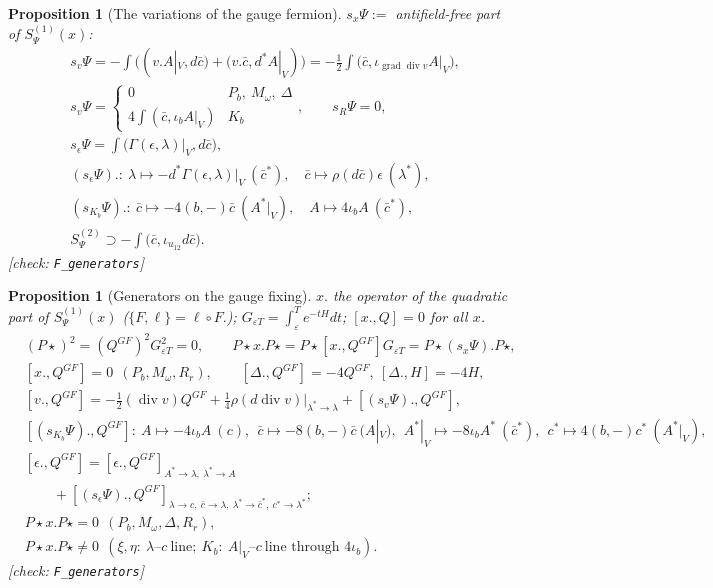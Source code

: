 \documentclass[11pt]{article}
\theoremstyle{plain}
\newtheorem{proposition}[theorem]{Proposition}
\theoremstyle{definition}
\numberwithin{equation}{section}
\begin{document}
\begin{proposition}[The variations of the gauge fermion]
\label{prop:sx}
$s_x\Psi:=$ antifield-free part of $S^{(1)}_\Psi(x)$:
\[
\begin{aligned}
&s_v\Psi=-\int\big((v.A|_V,d\bar c)+(v.\bar c,d^*A|_V)\big)=-\tfrac12\int\big(\bar c,\iota_{\operatorname{grad}\operatorname{div}v}A|_V\big),\\
&s_v\Psi=\begin{cases}0&P_b,\ M_\omega,\ \Delta\\ 4\int(\bar c,\iota_{b}A|_V)&K_b\end{cases},\qquad s_{R}\Psi=0,\\
&s_\epsilon\Psi=\int\big(\Gamma(\epsilon,\lambda)|_V,d\bar c\big),\\
&(s_\epsilon\Psi).:\ \lambda\mapsto-d^*\Gamma(\epsilon,\lambda)|_V\ (\bar c^*),\quad \bar c\mapsto\rho(d\bar c)\epsilon\ (\lambda^*),\\
&(s_{K_b}\Psi).:\ \bar c\mapsto-4(b,-)\bar c\ (A^*|_V),\quad A\mapsto4\iota_bA\ (\bar c^*),\\
&S^{(2)}_\Psi\supset-\int\big(\bar c,\iota_{u_{12}}d\bar c\big).
\end{aligned}
\]
[check: \texttt{F\_generators}]
\end{proposition}

\begin{proposition}[Generators on the gauge fixing]
\label{prop:gen}
$x.$ the operator of the quadratic part of $S^{(1)}_\Psi(x)$ ($\{F,\ell\}=\ell\circ F.$); $G_{\varepsilon T}=\int_\varepsilon^Te^{-tH}dt$; $[x.,Q]=0$ for all $x$.
\[
\begin{aligned}
&(P\star)^2=(Q^{GF})^2G_{\varepsilon T}^2=0,\qquad P\star x.P\star=P\star[x.,Q^{GF}]G_{\varepsilon T}=P\star(s_x\Psi).P\star,\\
&[x.,Q^{GF}]=0\ \ (P_b,M_\omega,R_r),\qquad [\Delta.,Q^{GF}]=-4Q^{GF},\ [\Delta.,H]=-4H,\\
&[v.,Q^{GF}]=-\tfrac12(\operatorname{div}v)Q^{GF}+\tfrac14\rho(d\operatorname{div}v)|_{\lambda^*\to\lambda}+[(s_v\Psi).,Q^{GF}],\\
&[(s_{K_b}\Psi).,Q^{GF}]:\ A\mapsto-4\iota_bA\ (c),\ \ \bar c\mapsto-8(b,-)\bar c\ (A|_V),\ \ A^*|_V\mapsto-8\iota_bA^*\ (\bar c^*),\ \ c^*\mapsto4(b,-)c^*\ (A^*|_V),\\
&[\epsilon.,Q^{GF}]=[\epsilon.,Q^{GF}]_{A^*\to\lambda,\ \lambda^*\to A}\\
&\qquad+[(s_\epsilon\Psi).,Q^{GF}]_{\lambda\to c,\ \bar c\to\lambda,\ \lambda^*\to\bar c^*,\ c^*\to\lambda^*};\\
&P\star x.P\star=0\ \ (P_b,M_\omega,\Delta,R_r),\\
&P\star x.P\star\neq0\ \ (\xi,\eta:\ \lambda\text{--}c\ \text{line};\ K_b:\ A|_V\text{--}c\ \text{line through }4\iota_b).
\end{aligned}
\]
[check: \texttt{F\_generators}]
\end{proposition}
\end{document}
